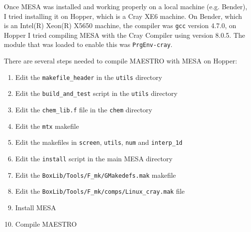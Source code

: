 
Once {\sf MESA} was installed and working properly on a local machine (e.g. 
Bender), I tried installing it on Hopper, which is a Cray XE6 machine. On 
Bender, which is an Intel(R) Xeon(R) X5650 machine, the compiler was 
{\tt gcc} version 4.7.0, on Hopper I tried compiling {\sf MESA} with the 
Cray Compiler using version 8.0.5. The module that was loaded to enable this 
was {\tt PrgEnv-cray}.

There are several steps needed to compile {\sf MAESTRO} with {\sf MESA} on 
Hopper:
\begin{enumerate}
\item Edit the {\tt makefile\_header} in the {\tt utils} directory
\item Edit the {\tt build\_and\_test} script in the {\tt utils} directory
\item Edit the {\tt chem\_lib.f} file in the {\tt chem} directory
\item Edit the {\tt mtx} makefile
\item Edit the makefiles in {\tt screen}, {\tt utils}, {\tt num} and 
{\tt interp\_1d}
\item Edit the {\tt install} script in the main {\sf MESA} directory
\item Edit the {\tt BoxLib/Tools/F\_mk/GMakedefs.mak} makefile
\item Edit the {\tt BoxLib/Tools/F\_mk/comps/Linux\_cray.mak} file
\item Install {\sf MESA}
\item Compile {\sf MAESTRO}
\end{enumerate}

